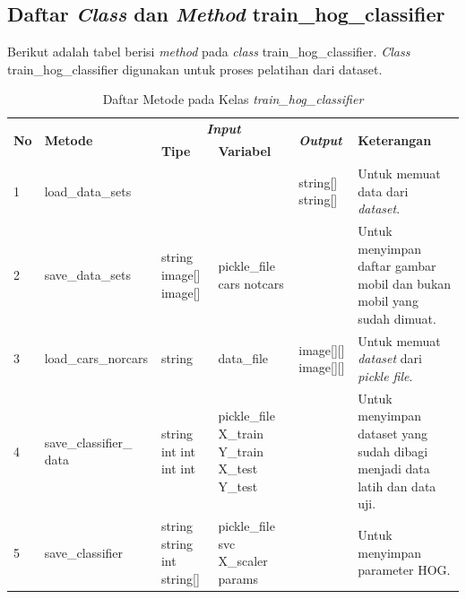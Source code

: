 \subsection{Daftar \textit{Class} dan \textit{Method} train\_hog\_classifier}
Berikut adalah tabel berisi \textit{method} pada \textit{class} train\_hog\_classifier. \textit{Class} train\_hog\_classifier digunakan untuk proses pelatihan dari dataset.
\begin{small}
	\begin{longtable}{|p{0.4cm}|p{2.6cm}|p{2cm}|p{2.5cm}|p{1.5cm}|p{4.5cm}|}
		\caption{Daftar Metode pada Kelas \textit{train\_hog\_classifier}} \\	
		\hline
		\multirow{2}{*}{\textbf{No}} & \multirow{2}{*}{\textbf{Metode}} & \multicolumn{2}{c|}{\textit{\textbf{Input}}} & \multirow{2}{*}{\textit{\textbf{Output}}} & 
		\multirow{2}{*}{\textbf{Keterangan}}\\
		\cline{3-4}
		& & \textbf{Tipe} & \textbf{Variabel} & & \\
		\hline
		1 & load\_data\_sets &  &  & string[] \newline string[] & Untuk memuat data dari \textit{dataset}.\\
		\hline
		2 & save\_data\_sets & string \newline image[] \newline image[] & pickle\_file \newline cars \newline notcars &  & Untuk menyimpan daftar gambar mobil dan bukan mobil yang sudah dimuat.\\
		\hline
		3 & load\_cars\_norcars & string & data\_file & image[][] \newline image[][] & Untuk memuat \textit{dataset} dari \textit{pickle file}.\\
		\hline
		4 & save\_classifier\_ \newline data & string \newline int \newline int \newline int \newline int & pickle\_file \newline X\_train \newline Y\_train \newline X\_test \newline Y\_test &  & Untuk menyimpan dataset yang sudah dibagi menjadi data latih dan data uji.\\
		\hline
		5 & save\_classifier & string \newline string \newline int \newline string[] & pickle\_file \newline svc \newline X\_scaler \newline params \newline &  & Untuk menyimpan parameter HOG.\\

\end{longtable}
\end{small}
